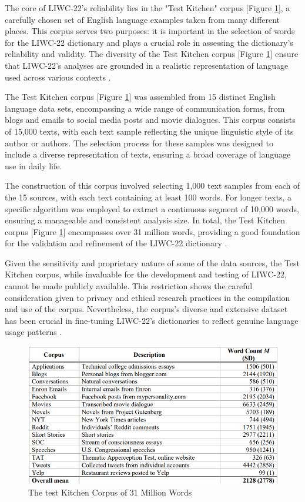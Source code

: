 The core of LIWC-22's reliability lies in the "Test Kitchen" corpus [Figure \ref{FigKitchenCorpus}], a carefully chosen set of English language examples taken from many different places. This corpus serves two purposes: it is important in the selection of words for the LIWC-22 dictionary and plays a crucial role in assessing the dictionary's reliability and validity. The diversity of the Test Kitchen corpus [Figure \ref{FigKitchenCorpus}] ensure that LIWC-22's analyses are grounded in a realistic representation of language used across various contexts \cite{boyd2022development}.

The Test Kitchen corpus [Figure \ref{FigKitchenCorpus}] was assembled from 15 distinct English language data sets, encompassing a wide range of communication forms, from blogs and emails to social media posts and movie dialogues. This corpus consists of 15,000 texts, with each text sample reflecting the unique linguistic style of its author or authors. The selection process for these samples was designed to include a diverse representation of texts, ensuring a broad coverage of language use in daily life.

The construction of this corpus involved selecting 1,000 text samples from each of the 15 sources, with each text containing at least 100 words. For longer texts, a specific algorithm was employed to extract a continuous segment of 10,000 words, ensuring a manageable and consistent analysis size. In total, the Test Kitchen corpus [Figure \ref{FigKitchenCorpus}] encompasses over 31 million words, providing a good foundation for the validation and refinement of the LIWC-22 dictionary \cite{boyd2022development}.

Given the sensitivity and proprietary nature of some of the data sources, the Test Kitchen corpus, while invaluable for the development and testing of LIWC-22, cannot be made publicly available. This restriction shows the careful consideration given to privacy and ethical research practices in the compilation and use of the corpus. Nevertheless, the corpus's diverse and extensive dataset has been crucial in fine-tuning LIWC-22's dictionaries to reflect genuine language usage patterns .

\begin{figure}[htbp]
	\centering
		\includegraphics[scale=0.65]{./figures/test-kitchen-corpus.png}
	\caption{The test Kitchen Corpus of 31 Million Words \cite{boyd2022development}}
	\label{FigKitchenCorpus}
\end{figure}

